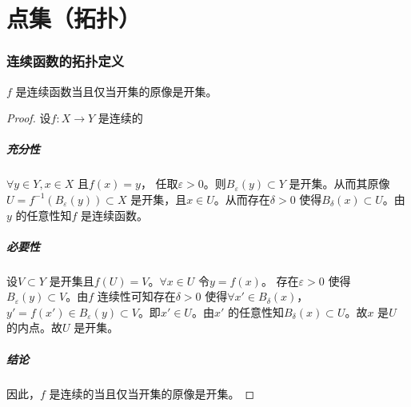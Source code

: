 \chapter{点集（拓扑）}
\subsection{连续函数的拓扑定义}
\begin{definition}{}{}
    \(f\) 是连续函数当且仅当开集的原像是开集。
\end{definition}

\begin{proof}
    设\(f: X\to Y\) 是连续的
    \paragraph{充分性}
    \(\forall y \in Y, x \in X\) 且\(f(x)=y\)，
    任取\(\varepsilon >0\)。则\(B_{\varepsilon}(y) \subset Y\)
    是开集。从而其原像\(U=f^{-1}\left( B_{\varepsilon}(y)
    \right)\subset X\) 是开集，且\(x \in U\)。从而存在\(\delta >0\)
    使得\(B_{\delta}(x) \subset U\)。由\(y\) 的任意性知\(f\) 是连续函数。
    \paragraph{必要性}
    设\(V \subset Y\) 是开集且\(f(U)=V\)。\(\forall x \in U\) 令\(y=f(x)\)。
    存在\(\varepsilon >0\) 使得\(B_{\varepsilon}(y) \subset
    V\)。由\(f\) 连续性可知存在\(\delta >0\) 使得\(\forall x' \in
    B_{\delta}(x)\)，\(y'=f(x')\in B_{\varepsilon}(y)
    \subset V\)。即\(x' \in U\)。由\(x'\)
    的任意性知\(B_{\delta}(x) \subset U\)。故\(x\) 是\(U\) 的内点。故\(U\) 是开集。
    \paragraph{结论}
    因此，\(f\) 是连续的当且仅当开集的原像是开集。
\end{proof}


